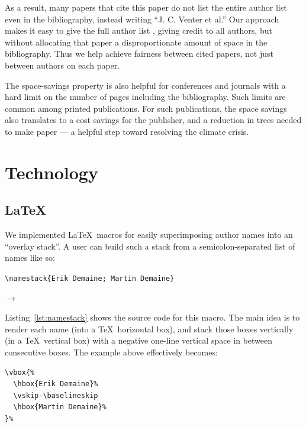 \documentclass[natbib,authoryear]{sigtbd17-style}
\begin{document}
As a result, many papers that cite this paper do not list the entire
author list even in the bibliography, instead writing ``J. C. Venter et al.''
Our approach makes it easy to give the full author list \cite{human-genome},
giving credit to all authors, but without allocating that paper a
disproportionate amount of space in the bibliography.
Thus we help achieve fairness between cited papers, not just between authors
on each paper.

The space-savings property is also helpful for conferences and journals
with a hard limit on the number of pages including the bibliography.
Such limits are common among printed publications.
For such publications, the space savings also translates to a cost savings
for the publisher, and a reduction in trees needed to make paper ---
a helpful step toward resolving the climate crisis.

\section{Technology}

\subsection{\LaTeX}

We implemented \LaTeX\ macros for easily superimposing author names
into an ``overlay stack''.
A user can build such a stack from a semicolon-separated list of names
like so:

\begin{center}
  \lstinline|\namestack{Erik Demaine; Martin Demaine}|

  $\to$ ~
\end{center}



Listing~\ref{lst:namestack} shows the source code for this macro.
The main idea is to render each name (into a \TeX\ horizontal box),
and stack those boxes vertically (in a \TeX\ vertical box)
with a negative one-line vertical space in between consecutive boxes.
The example above effectively becomes:

\begin{lstlisting}
\vbox{%
  \hbox{Erik Demaine}%
  \vskip-\baselineskip
  \hbox{Martin Demaine}%
}%
\end{lstlisting}
\end{document}
